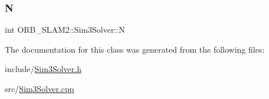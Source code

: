 \subsubsection{\texorpdfstring{N}{N}}
{\footnotesize\ttfamily int O\+R\+B\+\_\+\+S\+L\+A\+M2\+::\+Sim3\+Solver\+::N\hspace{0.3cm}{\ttfamily [protected]}}



The documentation for this class was generated from the following files\+:\begin{DoxyCompactItemize}
\item 
include/\mbox{\hyperlink{_sim3_solver_8h}{Sim3\+Solver.\+h}}\item 
src/\mbox{\hyperlink{_sim3_solver_8cpp}{Sim3\+Solver.\+cpp}}\end{DoxyCompactItemize}

